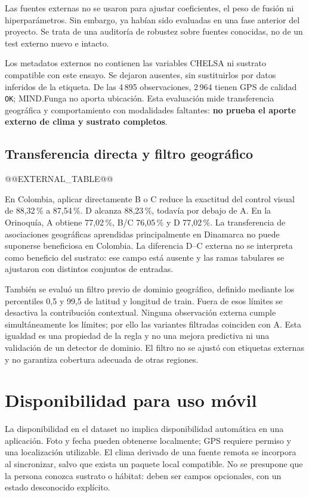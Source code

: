 \documentclass[11pt,a4paper]{article}
\begin{document}
Las fuentes externas no se usaron para ajustar coeficientes, el peso de fusión
ni hiperparámetros. Sin embargo, ya habían sido evaluadas en una fase anterior
del proyecto. Se trata de una auditoría de robustez sobre fuentes conocidas,
no de un test externo nuevo e intacto.

Los metadatos externos no contienen las variables CHELSA ni sustrato compatible
con este ensayo. Se dejaron ausentes, sin sustituirlos por datos inferidos de
la etiqueta. De las 4\,895 observaciones, 2\,964 tienen GPS de calidad
\texttt{OK}; MIND.Funga no aporta ubicación. Esta evaluación mide transferencia
geográfica y comportamiento con modalidades faltantes: \textbf{no prueba el
aporte externo de clima y sustrato completos}.

\subsection{Transferencia directa y filtro geográfico}
@@EXTERNAL_TABLE@@

En Colombia, aplicar directamente B o C reduce la exactitud del control
visual de 88,32\,\% a 87,54\,\%. D alcanza 88,23\,\%, todavía por debajo de A.
En la Orinoquía, A obtiene 77,02\,\%, B/C 76,05\,\% y D 77,02\,\%.
La transferencia de asociaciones geográficas aprendidas principalmente en
Dinamarca no puede suponerse beneficiosa en Colombia. La diferencia D--C
externa no se interpreta como beneficio del sustrato: ese campo está ausente y
las ramas tabulares se ajustaron con distintos conjuntos de entradas.

También se evaluó un filtro previo de dominio geográfico, definido mediante
los percentiles 0,5 y 99,5 de latitud y longitud de train. Fuera de esos límites
se desactiva la contribución contextual. Ninguna observación externa cumple
simultáneamente los límites; por ello las variantes filtradas coinciden con A.
Esta igualdad es una propiedad de la regla y no una mejora predictiva ni una
validación de un detector de dominio. El filtro no se ajustó con etiquetas
externas y no garantiza cobertura adecuada de otras regiones.

\section{Disponibilidad para uso móvil}
La disponibilidad en el dataset no implica disponibilidad automática en una
aplicación. Foto y fecha pueden obtenerse localmente; GPS requiere permiso y
una localización utilizable. El clima derivado de una fuente remota se
incorpora al sincronizar, salvo que exista un paquete local compatible. No se
presupone que la persona conozca sustrato o hábitat: deben ser campos opcionales,
con un estado desconocido explícito.
\end{document}
